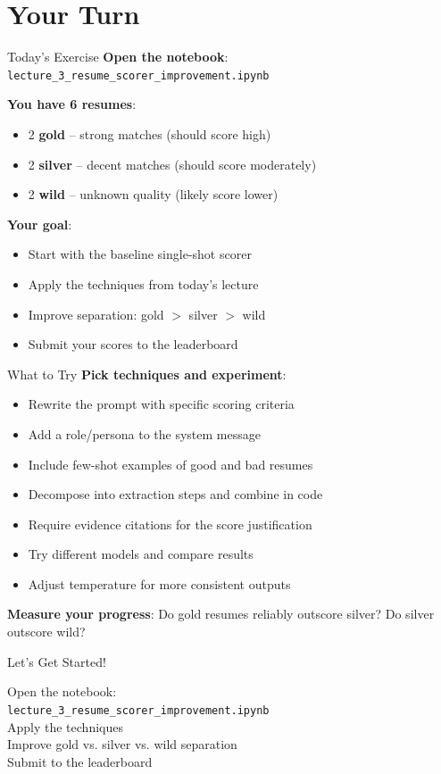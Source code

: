 \documentclass[aspectratio=169]{beamer}
\begin{document}
\section{Your Turn}

\begin{frame}{Today's Exercise}
\textbf{Open the notebook}: \texttt{lecture\_3\_resume\_scorer\_improvement.ipynb}
\vspace{0.3cm}

\textbf{You have 6 resumes}:
\begin{itemize}
    \item 2 \textbf{gold} -- strong matches (should score high)
    \item 2 \textbf{silver} -- decent matches (should score moderately)
    \item 2 \textbf{wild} -- unknown quality (likely score lower)
\end{itemize}
\vspace{0.3cm}

\textbf{Your goal}:
\begin{itemize}
    \item Start with the baseline single-shot scorer
    \item Apply the techniques from today's lecture
    \item Improve separation: gold $>$ silver $>$ wild
    \item Submit your scores to the leaderboard
\end{itemize}
\end{frame}

\begin{frame}{What to Try}
\textbf{Pick techniques and experiment}:
\vspace{0.3cm}

\begin{itemize}
    \item Rewrite the prompt with specific scoring criteria
    \item Add a role/persona to the system message
    \item Include few-shot examples of good and bad resumes
    \item Decompose into extraction steps and combine in code
    \item Require evidence citations for the score justification
    \item Try different models and compare results
    \item Adjust temperature for more consistent outputs
\end{itemize}
\vspace{0.3cm}

\textbf{Measure your progress}: Do gold resumes reliably outscore silver? Do silver outscore wild?
\end{frame}

\begin{frame}{Let's Get Started!}
\begin{center}
\Large
Open the notebook: \\[0.3cm]
\texttt{lecture\_3\_resume\_scorer\_improvement.ipynb}
\\[1cm]

Apply the techniques \\[0.3cm]
Improve gold vs. silver vs. wild separation \\[0.3cm]
Submit to the leaderboard
\end{center}
\end{frame}
\end{document}

